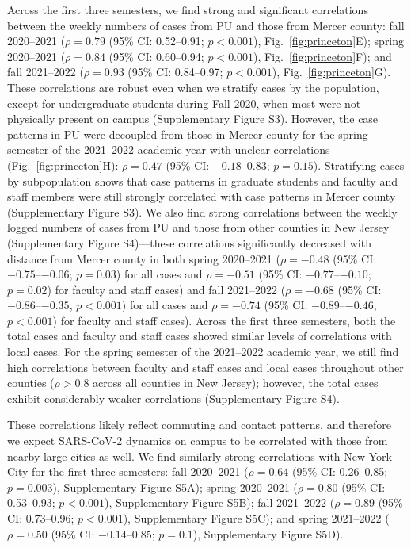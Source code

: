 \documentclass[12pt]{article}
\newcommand{\fref}[1]{Fig.~\ref{fig:#1}}
\begin{document}
Across the first three semesters, we find strong and significant correlations between the weekly numbers of cases from PU and those from Mercer county:
fall 2020--2021 ($\rho = 0.79$ (95\% CI: 0.52--0.91; $p < 0.001$), \fref{princeton}E); spring 2020--2021 ($\rho = 0.84$ (95\% CI: 0.60--0.94; $p < 0.001$), \fref{princeton}F); and fall 2021--2022 ($\rho = 0.93$ (95\% CI: 0.84--0.97; $p < 0.001$), \fref{princeton}G). 
These correlations are robust even when we stratify cases by the population, except for undergraduate students during Fall 2020, when most were not physically present on campus (Supplementary Figure S3).
However, the case patterns in PU were decoupled from those in Mercer county for the spring semester of the 2021--2022 academic year with unclear correlations (\fref{princeton}H): $\rho = 0.47$ (95\% CI: $-0.18$--0.83; $p = 0.15$).
Stratifying cases by subpopulation shows that case patterns in graduate students and faculty and staff members were still strongly correlated with case patterns in Mercer county (Supplementary Figure S3). 
We also find strong correlations between the weekly logged numbers of cases from PU and those from other counties in New Jersey (Supplementary Figure S4)---these correlations significantly decreased with distance from Mercer county in both spring 2020--2021 ($\rho=-0.48$ (95\% CI: $-0.75$--$-0.06$; $p = 0.03$) for all cases and $\rho=-0.51$ (95\% CI: $-0.77$--$-0.10$; $p = 0.02$) for faculty and staff cases) and fall 2021--2022 ($\rho=-0.68$ (95\% CI: $-0.86$--$-0.35$, $p < 0.001$) for all cases and $\rho=-0.74$ (95\% CI: $-0.89$--$-0.46$, $p < 0.001$) for faculty and staff cases).
Across the first three semesters, both the total cases and faculty and staff cases showed similar levels of correlations with local cases.
For the spring semester of the 2021--2022 academic year, we still find high correlations between faculty and staff cases and local cases throughout other counties ($\rho > 0.8$ across all counties in New Jersey); however, the total cases exhibit considerably weaker correlations (Supplementary Figure S4).    

These correlations likely reflect commuting and contact patterns, and therefore we expect SARS-CoV-2 dynamics on campus to be correlated with those from nearby large cities as well. 
We find similarly strong correlations with New York City for the first three semesters: fall 2020--2021 ($\rho = 0.64$ (95\% CI: 0.26--0.85; $p = 0.003$), Supplementary Figure S5A); spring 2020--2021 ($\rho = 0.80$ (95\% CI: 0.53--0.93; $p < 0.001$), Supplementary Figure S5B); fall 2021--2022 ($\rho = 0.89$ (95\% CI: 0.73--0.96; $p < 0.001$), Supplementary Figure S5C); and spring 2021--2022 ($\rho = 0.50$ (95\% CI: $-0.14$--0.85; $p=0.1$), Supplementary Figure S5D).
\end{document}
